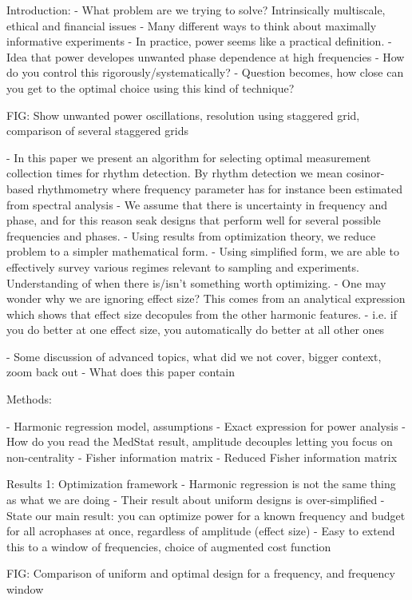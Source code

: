 Introduction:
- What problem are we trying to solve? Intrinsically multiscale, ethical and financial issues
- Many different ways to think about maximally informative experiments
- In practice, power seems like a practical definition.
- Idea that power developes unwanted phase dependence at high frequencies
- How do you control this rigorously/systematically?
- Question becomes, how close can you get to the optimal choice using this kind of technique?

FIG: Show unwanted power oscillations, resolution using staggered grid, comparison of several staggered grids

- In this paper we present an algorithm for selecting optimal measurement collection times for rhythm detection. By rhythm detection we mean cosinor-based rhythmometry where frequency parameter has for instance been estimated from spectral analysis
- We assume that there is uncertainty in frequency and phase, and for this reason seak designs that perform well for several possible frequencies and phases.
- Using results from optimization theory, we reduce problem to a simpler mathematical form.
- Using simplified form, we are able to effectively survey various regimes relevant to sampling and experiments. Understanding of when there is/isn't something worth optimizing.
- One may wonder why we are ignoring effect size? This comes from an analytical expression which shows that effect size decopules from the other harmonic features.
- i.e. if you do better at one effect size, you automatically do better at all other ones

- Some discussion of advanced topics, what did we not cover, bigger context, zoom back out
- What does this paper contain


Methods:

- Harmonic regression model, assumptions 
- Exact expression for power analysis
- How do you read the MedStat result, amplitude decouples letting you focus on non-centrality
- Fisher information matrix
- Reduced Fisher information matrix

Results 1: Optimization framework
- Harmonic regression is not the same thing as what we are doing
- Their result about uniform designs is over-simplified
- State our main result: you can optimize power for a known frequency and budget for all acrophases at once, regardless of amplitude (effect size)
- Easy to extend this to a window of frequencies, choice of augmented cost function

FIG: Comparison of uniform and optimal design for a frequency, and frequency window

